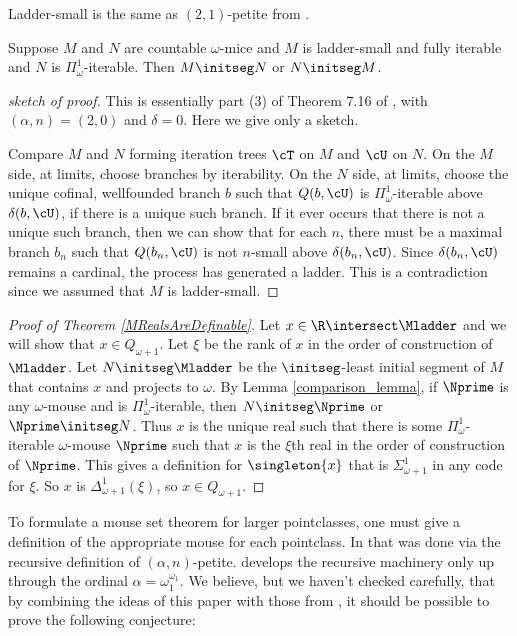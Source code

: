 \documentclass[oneside,12pt]{amsart}
\begin{document}
\begin{remark}
Ladder-small is the same as $(2,1)$-petite from \cite{Mouse_Sets}.
\end{remark}


\begin{lemma}
\label{comparison_lemma}
Suppose $M$ and $N$ are countable $\omega$-mice and $M$ is
ladder-small and fully iterable and $N$ is $\Pi^1_{\omega}$-iterable.
Then $M\initseg N$ or $N\initseg M$.
\end{lemma}
\begin{proof}[sketch of proof]
This is essentially part (3) of Theorem 7.16 of \cite{Mouse_Sets}, with $(\alpha,n)=(2,0)$
and $\delta=0$.
Here we give only a sketch.

Compare $M$ and $N$ forming iteration trees $\cT$ on $M$
and $\cU$ on $N$. On the $M$ side, at limits, choose branches by iterability.
On the $N$ side, at limits, choose the unique cofinal, wellfounded
branch $b$ such that $Q(b,\cU)$ is $\Pi^1_{\omega}$-iterable above $\delta(b,\cU)$,
if there is a unique such branch. If it ever occurs that there is not a
unique such branch, then we can show that for each $n$, there must be a maximal
branch $b_n$ such that $Q(b_n,\cU)$ is not $n$-small above $\delta(b_n,\cU)$.
Since $\delta(b_n, \cU)$ remains a cardinal, the process has generated a ladder.
This is a contradiction since we assumed that $M$ is ladder-small.
\end{proof}

\begin{proof}[Proof of Theorem \ref{MRealsAreDefinable}]
Let $x\in\R\intersect\Mladder$ and we will show that $x\in Q_{\omega+1}$. Let $\xi$
be the rank of $x$ in the order of construction of $\Mladder$. Let $N\initseg\Mladder$
be the $\initseg$-least initial segment of $M$ that contains $x$ and projects
to $\omega$. By Lemma \ref{comparison_lemma}, if $\Nprime$ is any $\omega$-mouse
and is $\Pi^1_{\omega}$-iterable, then $N\initseg\Nprime$
or $\Nprime\initseg N$. Thus $x$ is the unique real such that there is some
$\Pi^1_{\omega}$-iterable $\omega$-mouse $\Nprime$ such that
$x$ is the $\xi$th real in the order of construction of $\Nprime$. This gives
a definition for $\singleton{x}$ that is $\Sigma^1_{\omega+1}$ in any code
for $\xi$. So $x$ is $\Delta^1_{\omega+1}(\xi)$, so $x\in Q_{\omega+1}$.
\end{proof}

To formulate a mouse set theorem for larger pointclasses, one must give a definition
of the appropriate mouse for each pointclass. In \cite{Mouse_Sets} that was done
via the recursive definition of $(\alpha,n)$-petite.  \cite{Mouse_Sets} develops
the recursive machinery only up through the ordinal $\alpha=\omega_1^{\omega_1}$.
We believe, but we haven't checked carefully, that by combining the ideas of
this paper with those from
\cite{Mouse_Sets}, it should be possible to prove the following conjecture:
\end{document}
